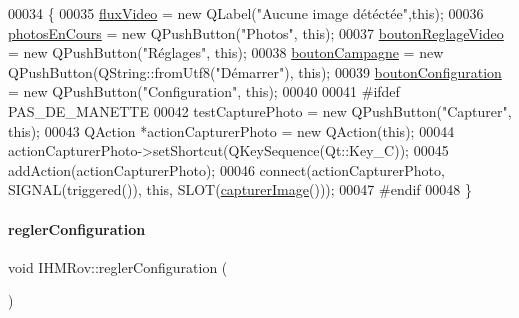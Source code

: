 \begin{DoxyCode}
00034 \{
00035     \hyperlink{class_i_h_m_rov_acdeabe02e1431b5c1817cb2a89debd0a}{fluxVideo} = \textcolor{keyword}{new} QLabel(\textcolor{stringliteral}{"Aucune image détéctée"},\textcolor{keyword}{this});
00036     \hyperlink{class_i_h_m_rov_a0896dea1a2d901a7cf43a344e22fc66d}{photosEnCours} = \textcolor{keyword}{new} QPushButton(\textcolor{stringliteral}{"Photos"}, \textcolor{keyword}{this});
00037     \hyperlink{class_i_h_m_rov_a57cb3bea4f1f9149d730ccc5688581fc}{boutonReglageVideo} = \textcolor{keyword}{new} QPushButton(\textcolor{stringliteral}{"Réglages"}, \textcolor{keyword}{this});
00038     \hyperlink{class_i_h_m_rov_a324be23537f48127c49b943aa439a978}{boutonCampagne} = \textcolor{keyword}{new} QPushButton(QString::fromUtf8(\textcolor{stringliteral}{"Démarrer"}), \textcolor{keyword}{this});
00039     \hyperlink{class_i_h_m_rov_aea67721180bf155892a297b3c39309c5}{boutonConfiguration} = \textcolor{keyword}{new} QPushButton(\textcolor{stringliteral}{"Configuration"}, \textcolor{keyword}{this});
00040 
00041 \textcolor{preprocessor}{    #ifdef PAS\_DE\_MANETTE}
00042     testCapturePhoto = \textcolor{keyword}{new} QPushButton(\textcolor{stringliteral}{"Capturer"}, \textcolor{keyword}{this});
00043     QAction *actionCapturerPhoto = \textcolor{keyword}{new} QAction(\textcolor{keyword}{this});
00044     actionCapturerPhoto->setShortcut(QKeySequence(Qt::Key\_C));
00045     addAction(actionCapturerPhoto);
00046     connect(actionCapturerPhoto, SIGNAL(triggered()), \textcolor{keyword}{this}, SLOT(\hyperlink{class_i_h_m_rov_a15fe4fd090a0171bb9ad24e28d3b978a}{capturerImage}()));
00047 \textcolor{preprocessor}{    #endif}
00048 \}
\end{DoxyCode}
\mbox{\label{class_i_h_m_rov_a9b517b4891917634d64c903894bcc48b}} 
\paragraph{\texorpdfstring{regler\+Configuration}{reglerConfiguration}}
{\footnotesize\ttfamily void I\+H\+M\+Rov\+::regler\+Configuration (\begin{DoxyParamCaption}{ }\end{DoxyParamCaption})\hspace{0.3cm}{\ttfamily [slot]}}



